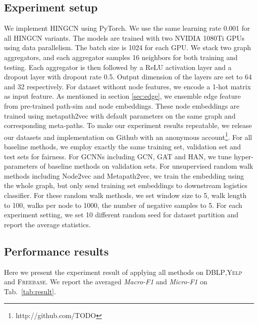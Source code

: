 \subsection{Experiment setup}
\label{sec:setup}
We implement HINGCN using PyTorch. We use the same learning rate 0.001 for all HINGCN variants. The models  are trained with two NVIDIA 1080Ti GPUs using data parallelism. The batch size is 1024 for each GPU. We stack two graph aggregators, and each aggregator samples 16 neighbors for both training and testing. Each aggregator is then followed by a ReLU activation layer and a dropout layer with dropout rate 0.5. Output dimension of the layers are set to 64 and 32 respectively. For dataset without node features, we encode a 1-hot matrix as input feature. As mentioned in section \ref{sec:edge}, we ensemble edge feature from pre-trained path-sim and node embeddings. These node embeddings are trained using metapath2vec \citep{DongCS17} with default parameters on the same graph and corresponding meta-paths. 
To make our experiment results repeatable, we release our datasets and implementation on Github with an anonymous account\footnote{http://github.com/TODO}.
For all baseline methods, we employ exactly the same training set, validation set and test sets for fairness. For GCNNs including GCN, GAT and HAN, we tune hyper-parameters of baseline methods on validation sets. For unsupervised random walk methods including Node2vec and Metapath2vec, we train the embedding using the whole graph, but only send training set embeddings to downstream logistics classifier. For these random walk methods, we set window size to 5, walk length to 100, walks per node to 1000, the number of negative samples to 5.
For each experiment setting, we set 10 different random seed for dataset partition and report the average statistics.

\subsection{Performance results}
\label{sec:results}

Here we present the experiment result of applying all  methods on \textsc{DBLP},\textsc{Yelp} and \textsc{Freebase}. We report the averaged \textit{Macro-F1} and \textit{Micro-F1} on Tab.~\ref{tab:result}.

